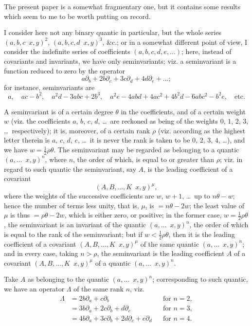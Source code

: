 \documentclass[11pt,a4paper]{book}
\begin{document}
The present paper is a somewhat fragmentary one, but it contains some results which seem to me to be worth putting on record.

I consider here not any binary quantic in particular, but the whole series $(a, b, c \!\!\!\! \,\,\, x, y)^2$, $(a, b, c, d \!\!\!\! \,\,\, x, y)^3$, \&c.; or in a somewhat different point of view, I consider the indefinite series of coefficients $(a, b, c, d, e, \ldots)$; here, instead of covariants and invariants, we have only seminvariants; viz. a seminvariant is a function reduced to zero by the operator
\[
a\partial_b + 2b\partial_c + 3c\partial_d + 4d\partial_e + \ldots;
\]
for instance, seminvariants are
\[
a, \quad ac - b^2, \quad a^2d - 3abc + 2b^3, \quad a^2e - 4abd + 4ac^2 + 4b^2d - 6abc^2 - b^2e, \quad \text{etc.}
\]

A seminvariant is of a certain degree $\theta$ in the coefficients, and of a certain weight $w$ (viz. the coefficients $a$, $b$, $c$, $d$, \ldots\ are reckoned as being of the weights $0$, $1$, $2$, $3$, \ldots\ respectively); it is, moreover, of a certain rank $\rho$ (viz. according as the highest letter therein is $a$, $c$, $d$, $e$, \ldots\ it is never the rank is taken to be $0$, $2$, $3$, $4$, \ldots), and we have $w = \frac{1}{2}\rho\theta$. The seminvariant may be regarded as belonging to a quantic $(a, \ldots \!\!\!\! \,\,\, x, y)^n$, where $n$, the order of which, is equal to or greater than $\rho$; viz. in regard to such quantic the seminvariant, say $A$, is the leading coefficient of a covariant
\[
(A, B, \ldots, K \!\!\!\! \,\,\, x, y)^\mu,
\]
where the weights of the successive coefficients are $w$, $w+1$, \ldots\ up to $n\theta - w$; hence the number of terms less unity, that is, $\mu$, is $= n\theta - 2w$; the least value of $\mu$ is thus $= \rho\theta - 2w$, which is either zero, or positive; in the former case, $w = \frac{1}{2}\rho\theta$, the seminvariant is an invariant of the quantic $(a, \ldots \!\!\!\! \,\,\, x, y)^n$, the order of which is equal to the rank of the seminvariant; but if $w < \frac{1}{2}\rho\theta$, then it is the leading coefficient of a covariant $(A, B, \ldots, K \!\!\!\! \,\,\, x, y)^\mu$ of the same quantic $(a, \ldots \!\!\!\! \,\,\, x, y)^n$; and in every case, taking $n > \rho$, the seminvariant is the leading coefficient $A$ of a covariant $(A, B, \ldots, K \!\!\!\! \,\,\, x, y)^\mu$ of a quantic $(a, \ldots \!\!\!\! \,\,\, x, y)^n$.

Take $A$ as belonging to the quantic $(a, \ldots \!\!\!\! \,\,\, x, y)^n$; corresponding to such quantic, we have an operator $\Lambda$ of the same rank $n$, viz.
\[
\begin{aligned}
\Lambda &= 2b\partial_a + c\partial_b && \text{for } n=2, \\
&= 3b\partial_a + 2c\partial_b + d\partial_c && \text{for } n=3, \\
&= 4b\partial_a + 3c\partial_b + 2d\partial_c + e\partial_d && \text{for } n=4.
\end{aligned}
\]
\end{document}
